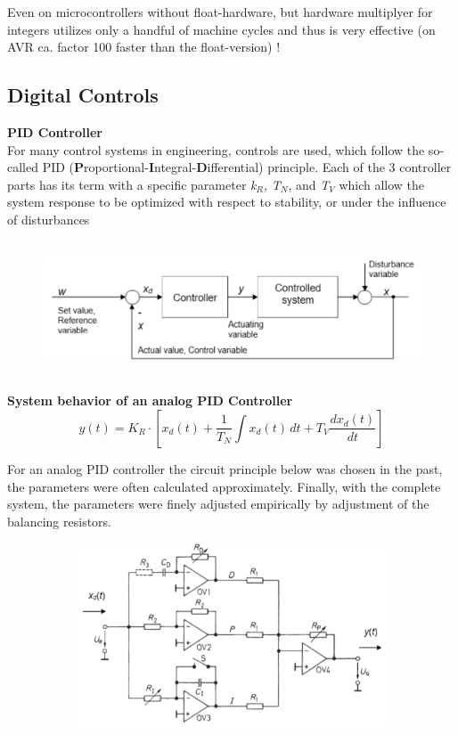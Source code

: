 Even on microcontrollers without float-hardware, but hardware multiplyer for integers utilizes only a handful of machine cycles and thus is very effective (on AVR ca. factor 100 faster than the float-version) !

\subsection{  Digital Controls}

{\rot\bf PID Controller}\\

For many control systems in engineering, controls are used, which follow the so-called PID (\textbf{P}roportional-\textbf{I}ntegral-\textbf{D}ifferential) principle. Each of the 3 controller parts has its term with a specific parameter \textit{k${}_{R}$,} \textit{T${}_{N}$}, and \textit{T${}_{V}$} which allow the system response to be optimized with respect to stability, or under the influence of disturbances

	\begin{figure}[h]
    \centering
    \includegraphics[width=14cm, height=4cm]{Images/image148.png}
    \label{fig:Fig }
    \end{figure}

{\rot\bf System behavior of an analog PID Controller}\\

\begin{equation}
	 y(t)=K_{R} \cdot \left[x_{d} (t)+\frac{1}{T_{N} } \int x_{d} (t)\, dt+T_{V}  \frac{dx_{d} (t)}{dt} \right]
\label{EQ }
\end{equation}

For an analog PID controller the circuit principle below was chosen in the past, the parameters were often calculated approximately. Finally, with the complete system, the parameters were finely adjusted empirically by adjustment of the balancing resistors.
\newpage

	\begin{figure}[h]
    \centering
    \includegraphics[width=12cm, height=5.5cm]{Images/image149.png}
    \label{fig:Fig }
    \end{figure}


